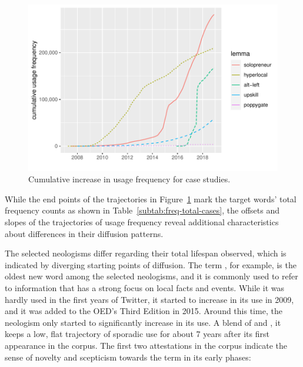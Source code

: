 \documentclass[
  a4paper,
  abstract=on,
  captions=tableabove
  ]{scrartcl}
\begin{document}
      \begin{figure}
        \caption[Cumulative increase in usage frequency]{Cumulative increase in usage frequency for case studies.\protect\footnotemark}
        \label{fig:freq_cum_cases}
        \centering
        \includegraphics[width=.8\linewidth]{img/freq_cum_cases.pdf}
      \end{figure}

      While the end points of the trajectories in Figure~\ref{fig:freq_cum_cases} mark the target words' total frequency counts as shown in Table~\ref{subtab:freq-total-cases}, the offsets and slopes of the trajectories of usage frequency reveal additional characteristics about differences in their diffusion patterns.



      The selected neologisms differ regarding their total lifespan observed, which is indicated by diverging starting points of diffusion. The term , for example, is the oldest new word among the selected neologisms, and it is commonly used to refer to information that has a strong focus on local facts and events. While it was hardly used in the first years of Twitter, it started to increase in its use in 2009, and it was added to the OED's Third Edition in 2015. Around this time, the neologism  only started to significantly increase in its use. A blend of  and , it keeps a low, flat trajectory of sporadic use for about 7 years after its first appearance in the corpus. The first two attestations in the corpus indicate the sense of novelty and scepticism towards the term in its early phases:
\end{document}
